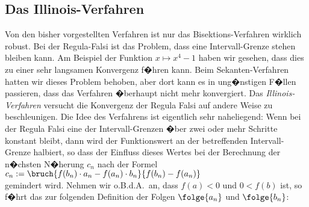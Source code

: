 \subsection{Das Illinois-Verfahren}
Von den bisher vorgestellten Verfahren ist nur das Bisektions-Verfahren wirklich robust.
Bei der Regula-Falsi ist das Problem, dass eine Intervall-Grenze stehen bleiben kann. Am
Beispiel der Funktion $x \mapsto x^4 - 1$ haben wir gesehen, dass dies zu einer sehr
langsamen Konvergenz f�hren kann.  Beim Sekanten-Verfahren hatten wir dieses Problem
behoben, aber dort kann es in ung�nstigen F�llen passieren, dass das Verfahren �berhaupt nicht mehr
konvergiert.  Das \emph{Illinois-Verfahren} \cite{dowell:1971} versucht die Konvergenz der Regula Falsi
auf andere Weise zu beschleunigen.  Die Idee des Verfahrens ist eigentlich sehr naheliegend:
Wenn bei der Regula Falsi eine der Intervall-Grenzen �ber zwei oder mehr Schritte konstant bleibt,
dann wird der Funktionswert an der betreffenden Intervall-Grenze halbiert, so dass der Einfluss dieses
Wertes bei der Berechnung der n�chsten N�herung $c_n$ nach der Formel
\\[0.2cm]
\hspace*{1.3cm}
$c_n := \bruch{f(b_n) \cdot a_n - f(a_n) \cdot b_n}{f(b_n) - f(a_n)}$
\\[0.2cm]
gemindert wird.  Nehmen wir o.B.d.A.~an, dass $f(a) < 0$ und $0 < f(b)$ ist, so f�hrt das zur folgenden 
Definition der Folgen $\folge{a_n}$ und $\folge{b_n}$:
